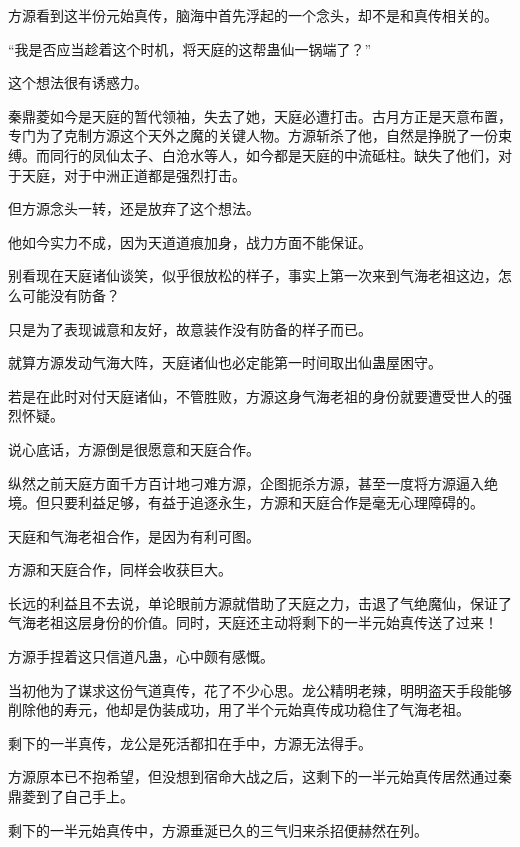 
\begin{this_body}



方源看到这半份元始真传，脑海中首先浮起的一个念头，却不是和真传相关的。

“我是否应当趁着这个时机，将天庭的这帮蛊仙一锅端了？”

这个想法很有诱惑力。

秦鼎菱如今是天庭的暂代领袖，失去了她，天庭必遭打击。古月方正是天意布置，专门为了克制方源这个天外之魔的关键人物。方源斩杀了他，自然是挣脱了一份束缚。而同行的凤仙太子、白沧水等人，如今都是天庭的中流砥柱。缺失了他们，对于天庭，对于中洲正道都是强烈打击。

但方源念头一转，还是放弃了这个想法。

他如今实力不成，因为天道道痕加身，战力方面不能保证。

别看现在天庭诸仙谈笑，似乎很放松的样子，事实上第一次来到气海老祖这边，怎么可能没有防备？

只是为了表现诚意和友好，故意装作没有防备的样子而已。

就算方源发动气海大阵，天庭诸仙也必定能第一时间取出仙蛊屋困守。

若是在此时对付天庭诸仙，不管胜败，方源这身气海老祖的身份就要遭受世人的强烈怀疑。

说心底话，方源倒是很愿意和天庭合作。

纵然之前天庭方面千方百计地刁难方源，企图扼杀方源，甚至一度将方源逼入绝境。但只要利益足够，有益于追逐永生，方源和天庭合作是毫无心理障碍的。

天庭和气海老祖合作，是因为有利可图。

方源和天庭合作，同样会收获巨大。

长远的利益且不去说，单论眼前方源就借助了天庭之力，击退了气绝魔仙，保证了气海老祖这层身份的价值。同时，天庭还主动将剩下的一半元始真传送了过来！

方源手捏着这只信道凡蛊，心中颇有感慨。

当初他为了谋求这份气道真传，花了不少心思。龙公精明老辣，明明盗天手段能够削除他的寿元，他却是伪装成功，用了半个元始真传成功稳住了气海老祖。

剩下的一半真传，龙公是死活都扣在手中，方源无法得手。

方源原本已不抱希望，但没想到宿命大战之后，这剩下的一半元始真传居然通过秦鼎菱到了自己手上。

剩下的一半元始真传中，方源垂涎已久的三气归来杀招便赫然在列。


\end{this_body}
